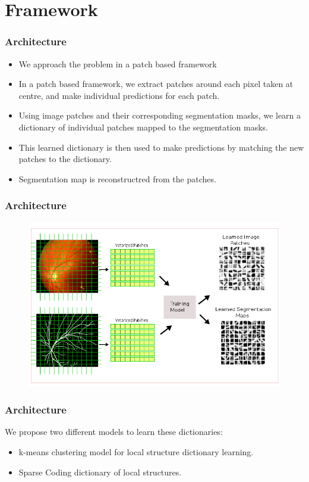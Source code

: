\documentclass{beamer}
\begin{document}
	\section{Framework}
	\begin{frame}
		\frametitle{Architecture}
		\begin{itemize}
			\item We approach the problem in a patch based framework
			\item In a patch based framework, we extract patches around each pixel taken at centre, and make individual predictions for each patch.
			\item Using image patches and their corresponding segmentation masks, we learn a dictionary of individual patches mapped to the segmentation masks.
			\item This learned dictionary is then used to make predictions by matching the new patches to the dictionary.
			\item Segmentation map is reconstructred from the patches.
		\end{itemize}
	\end{frame}
	
	\begin{frame}
		\frametitle{Architecture}
			\begin{figure}
				\includegraphics[width=1\linewidth]{framework/trainmodel.png}
			\end{figure}
	\end{frame}
	
	\begin{frame}
		\frametitle{Architecture}
		We propose two different models to learn these dictionaries:
		\begin{itemize}
			\item k-means clustering model for local structure dictionary learning.
			\item Sparse Coding dictionary of local structures.
		\end{itemize}
	\end{frame}
	
\end{document}
